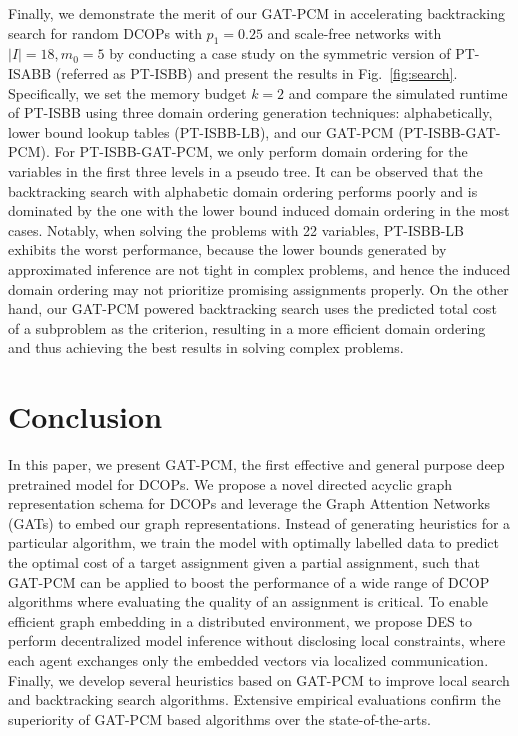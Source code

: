 \documentclass[letterpaper]{article} %
\begin{document}
Finally, we demonstrate the merit of our GAT-PCM in accelerating backtracking search for random DCOPs with $p_1=0.25$ and scale-free networks with $|I|=18, m_0=5$ by conducting a case study on the symmetric version of PT-ISABB \cite{dengCCJL19} (referred as PT-ISBB) and present the results in Fig.~\ref{fig:search}. Specifically, we set the memory budget $k=2$ and compare the simulated runtime of PT-ISBB using three domain ordering generation techniques: alphabetically, lower bound lookup tables (PT-ISBB-LB), and our GAT-PCM (PT-ISBB-GAT-PCM). For PT-ISBB-GAT-PCM, we only perform domain ordering for the variables in the first three levels in a pseudo tree. It can be observed that the backtracking search with alphabetic domain ordering performs poorly and is dominated by the one with the lower bound induced domain ordering in the most cases. Notably, when solving the problems with 22 variables, PT-ISBB-LB exhibits the worst performance, because the lower bounds generated by approximated inference are not tight in complex problems, and hence the induced domain ordering may not prioritize promising assignments properly. On the other hand, our GAT-PCM powered backtracking search uses the predicted total cost of a subproblem as the criterion, resulting in a more efficient domain ordering and thus achieving the best results in solving complex problems.

\section{Conclusion}
In this paper, we present GAT-PCM, the first effective and general purpose deep pretrained model for DCOPs. We propose a novel directed acyclic graph representation schema for DCOPs and leverage the Graph Attention Networks (GATs) to embed our graph representations. Instead of generating heuristics for a particular algorithm, we train the model with optimally labelled data to predict the optimal cost of a target assignment given a partial assignment, such that GAT-PCM can be applied to boost the performance of a wide range of DCOP algorithms where evaluating the quality of an assignment is critical.
To enable efficient graph embedding in a distributed environment, we propose DES to perform decentralized model inference without disclosing local constraints, where each agent exchanges only the embedded vectors via localized  communication.
Finally, we develop several heuristics based on GAT-PCM to improve local search and backtracking search algorithms. Extensive empirical evaluations confirm the superiority of GAT-PCM based algorithms over the state-of-the-arts.
\end{document}
